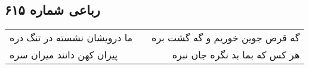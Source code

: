 \begin{center}
\section*{رباعی شماره ۶۱۵}
\label{sec:sh615}
\begin{longtable}{l p{0.5cm} r}
ما درویشان نشسته در تنگ دره
&&
گه قرص جوین خوریم و گه گشت بره
\\
پیران کهن دانند میران سره
&&
هر کس که بما بد نگره جان نبره
\\
\end{longtable}
\end{center}
